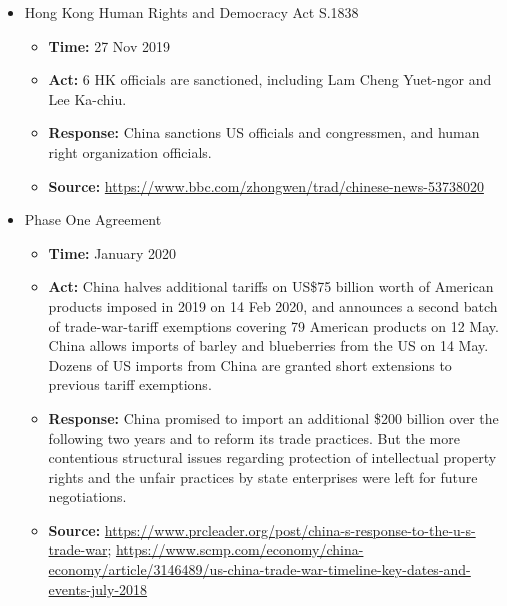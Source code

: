 \begin{itemize}
			\item Hong Kong Human Rights and Democracy Act S.1838
				\begin{itemize}
				\item \textbf{Time: }27 Nov 2019
				\item \textbf{Act: } 6 HK officials are sanctioned, including Lam Cheng Yuet-ngor and Lee Ka-chiu.
				\item \textbf{Response: } China sanctions US officials and congressmen, and human right organization officials.
				\item	\textbf{Source: }\url{https://www.bbc.com/zhongwen/trad/chinese-news-53738020}
				\end{itemize}
				
			\item Phase One Agreement
				\begin{itemize}
				\item \textbf{Time: }January 2020
				\item \textbf{Act: } China halves additional tariffs on US\$75 billion worth of American products imposed in 2019 on 14 Feb 2020, and announces a second batch of trade-war-tariff exemptions covering 79 American products on 12 May. China allows imports of barley and blueberries from the US on 14 May. Dozens of US imports from China are granted short extensions to previous tariff exemptions.
				\item \textbf{Response: } China promised to import an additional \$200 billion over the following two years and to reform its trade practices. But the more contentious structural issues regarding protection of intellectual property rights and the unfair practices by state enterprises were left for future negotiations.
				\item	\textbf{Source: }\url{https://www.prcleader.org/post/china-s-response-to-the-u-s-trade-war}; \url{https://www.scmp.com/economy/china-economy/article/3146489/us-china-trade-war-timeline-key-dates-and-events-july-2018}
				\end{itemize}
			\end{itemize}
			
